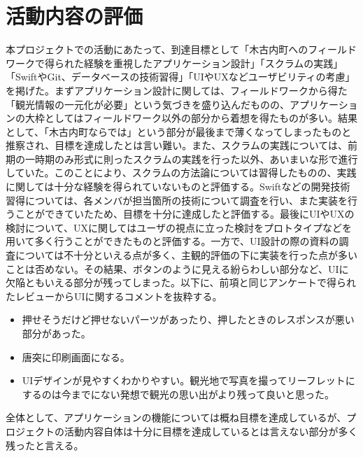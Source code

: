\section{活動内容の評価}
本プロジェクトでの活動にあたって、到達目標として「木古内町へのフィールドワークで得られた経験を重視したアプリケーション設計」「スクラムの実践」「SwiftやGit、データベースの技術習得」「UIやUXなどユーザビリティの考慮」を掲げた。まずアプリケーション設計に関しては、フィールドワークから得た「観光情報の一元化が必要」という気づきを盛り込んだものの、アプリケーションの大枠としてはフィールドワーク以外の部分から着想を得たものが多い。結果として、「木古内町ならでは」という部分が最後まで薄くなってしまったものと推察され、目標を達成したとは言い難い。また、スクラムの実践については、前期の一時期のみ形式に則ったスクラムの実践を行った以外、あいまいな形で進行していた。このことにより、スクラムの方法論については習得したものの、実践に関しては十分な経験を得られていないものと評価する。Swiftなどの開発技術習得については、各メンバが担当箇所の技術について調査を行い、また実装を行うことができていたため、目標を十分に達成したと評価する。最後にUIやUXの検討について、UXに関してはユーザの視点に立った検討をプロトタイプなどを用いて多く行うことができたものと評価する。一方で、UI設計の際の資料の調査については不十分といえる点が多く、主観的評価の下に実装を行った点が多いことは否めない。その結果、ボタンのように見える紛らわしい部分など、UIに欠陥ともいえる部分が残ってしまった。以下に、前項と同じアンケートで得られたレビューからUIに関するコメントを抜粋する。
\begin{itemize}
\item 押せそうだけど押せないパーツがあったり、押したときのレスポンスが悪い部分があった。
\item 唐突に印刷画面になる。
\item UIデザインが見やすくわかりやすい。観光地で写真を撮ってリーフレットにするのは今までにない発想で観光の思い出がより残って良いと思った。
\end{itemize}
全体として、アプリケーションの機能については概ね目標を達成しているが、プロジェクトの活動内容自体は十分に目標を達成しているとは言えない部分が多く残ったと言える。

